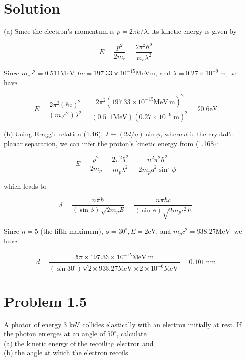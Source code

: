 \documentclass[10pt]{article}
\begin{document}
\section*{Solution}
(a) Since the electron's momentum is $p=2 \pi \hbar / \lambda$, its kinetic energy is given by


\begin{equation*}
E=\frac{p^{2}}{2 m_{e}}=\frac{2 \pi^{2} \hbar^{2}}{m_{e} \lambda^{2}} \tag{1.168}
\end{equation*}


Since $m_{e} c^{2}=0.511 \mathrm{MeV}, \hbar c=197.33 \times 10^{-15} \mathrm{MeV} \mathrm{m}$, and $\lambda=0.27 \times 10^{-9} \mathrm{~m}$, we have


\begin{equation*}
E=\frac{2 \pi^{2}(\hbar c)^{2}}{\left(m_{e} c^{2}\right) \lambda^{2}}=\frac{2 \pi^{2}\left(197.33 \times 10^{-15} \mathrm{MeV} \mathrm{~m}\right)^{2}}{(0.511 \mathrm{MeV})\left(0.27 \times 10^{-9} \mathrm{~m}\right)^{2}}=20.6 \mathrm{eV} \tag{1.169}
\end{equation*}


(b) Using Bragg's relation (1.46), $\lambda=(2 d / n) \sin \phi$, where $d$ is the crystal's planar separation, we can infer the proton's kinetic energy from (1.168):


\begin{equation*}
E=\frac{p^{2}}{2 m_{p}}=\frac{2 \pi^{2} \hbar^{2}}{m_{p} \lambda^{2}}=\frac{n^{2} \pi^{2} \hbar^{2}}{2 m_{p} d^{2} \sin ^{2} \phi} \tag{1.170}
\end{equation*}


which leads to


\begin{equation*}
d=\frac{n \pi \hbar}{(\sin \phi) \sqrt{2 m_{p} E}}=\frac{n \pi \hbar c}{(\sin \phi) \sqrt{2 m_{p} c^{2} E}} \tag{1.171}
\end{equation*}


Since $n=5$ (the fifth maximum), $\phi=30^{\circ}, E=2 \mathrm{eV}$, and $m_{p} c^{2}=938.27 \mathrm{MeV}$, we have


\begin{equation*}
d=\frac{5 \pi \times 197.33 \times 10^{-15} \mathrm{MeV} \mathrm{~m}}{\left(\sin 30^{\circ}\right) \sqrt{2 \times 938.27 \mathrm{MeV} \times 2 \times 10^{-6} \mathrm{MeV}}}=0.101 \mathrm{~nm} \tag{1.172}
\end{equation*}


\section*{Problem 1.5}
A photon of energy 3 keV collides elastically with an electron initially at rest. If the photon emerges at an angle of $60^{\circ}$, calculate\\
(a) the kinetic energy of the recoiling electron and\\
(b) the angle at which the electron recoils.
\end{document}
